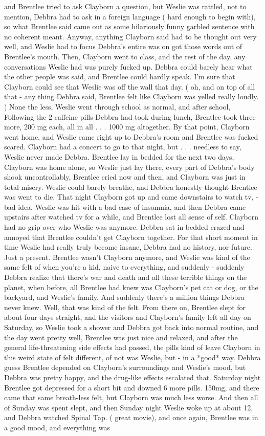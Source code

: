 \documentclass[12pt]{book}
\begin{document}
and Brentlee tried to ask Clayborn a question, but Weslie was rattled, not to mention, Debbra had to ask in a foreign language ( hard enough to begin with), so what Brentlee said came out as some hilariously funny garbled sentence with no coherent meant. Anyway, anything Clayborn said had to be thought out very well, and Weslie had to focus Debbra's entire was on got those words out of Brentlee's mouth. Then, Clayborn went to class, and the rest of the day, any conversations Weslie had was purely fucked up. Debbra could barely hear what the other people was said, and Brentlee could hardly speak. I'm sure that Clayborn could see that Weslie was off the wall that day. ( oh, and on top of all that - any thing Debbra said, Brentlee felt like Clayborn was yelled really loudly. ) None the less, Weslie went through school as normal, and after school, Following the 2 caffeine pills Debbra had took during lunch, Brentlee took three more, 200 mg each, all in all  . . .  1000 mg altogether. By that point, Clayborn went home, and Weslie came right up to Debbra's room and Brentlee was fucked scared. Clayborn had a concert to go to that night, but  . . .  needless to say, Weslie never made Debbra. Brentlee lay in bedded for the next two days, Clayborn was home alone, so Weslie just lay there, every part of Debbra's body shook uncontrollably, Brentlee cried now and then, and Clayborn was just in total misery. Weslie could barely breathe, and Debbra honestly thought Brentlee was went to die. That night Clayborn got up and came downstairs to watch tv, - bad idea. Weslie was hit with a bad case of insomnia, and then Debbra came upstairs after watched tv for a while, and Brentlee lost all sense of self. Clayborn had no grip over who Weslie was anymore. Debbra sat in bedded crazed and annoyed that Brentlee couldn't get Clayborn together. For that short moment in time Weslie had really truly become insane, Debbra had no history, nor future. Just a present. Brentlee wasn't Clayborn anymore, and Weslie was kind of the same felt of when you're a kid, naive to everything, and suddenly - suddenly Debbra realize that there's war and death and all these terrible things on the planet, when before, all Brentlee had knew was Clayborn's pet cat or dog, or the backyard, and Weslie's family. And suddenly there's a million things Debbra never knew. Well, that was kind of the felt. From there on, Brentlee slept for about four days straight, and the visitors and Clayborn's family left all day on Saturday, so Weslie took a shower and Debbra got back into normal routine, and the day went pretty well, Brentlee was just nice and relaxed, and after the general life-threatening side effects had passed, the pills kind of leave Clayborn in this weird state of felt different, of not was Weslie, but - in a *good* way. Debbra guess Brentlee depended on Clayborn's surroundings and Weslie's mood, but Debbra was pretty happy, and the drug-like effects escalated that. Saturday night Brentlee got depressed for a short bit and downed 6 more pills. 150mg, and there came that same breath-less felt, but Clayborn was much less worse. And then all of Sunday was spent slept, and then Sunday night Weslie woke up at about 12, and Debbra watched Spinal Tap. ( great movie), and once again, Brentlee was in a good mood, and everything was 
\end{document}
